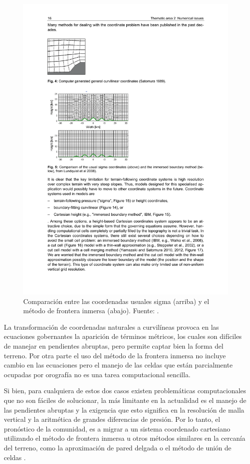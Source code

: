  
\begin{figure}[h!]
	\centering
	\includegraphics[width=0.8\linewidth,trim={2.6cm 13.5cm 9.2cm 9cm},clip]{Imagenes/02/coordinates}
	\caption{Comparación entre las coordenadas usuales sigma (arriba) y el método de frontera inmersa (abajo). Fuente: \cite{Arnold2010}.}
	\label{fig:02_coordinates}
\end{figure}
La transformación de coordenadas naturales a curvilíneas provoca en las ecuaciones gobernantes la aparición de términos métricos, los cuales son difíciles de manejar en pendientes abruptas, pero permite captar bien la forma del terreno. Por otra parte el uso del método de la frontera inmersa no incluye cambio en las ecuaciones pero el manejo de las celdas que están parcialmente ocupadas por orografía no es una tarea computacional sencilla.

Si bien, para cualquiera de estos dos casos existen problemáticas computacionales que no son fáciles de solucionar, la más limitante en la actualidad es el manejo de las pendientes abruptas y la exigencia que esto significa en la resolución de malla vertical y la aritmética de grandes diferencias de presión. Por lo tanto, el pronóstico de la comunidad, es a migrar a un sistema coordenado cartesiano utilizando el método de frontera inmersa u otros métodos similares en la cercanía del terreno, como la aproximación de pared delgada \citep{steppeler2002nonhydrostatic} o el método de unión de celdas \citep{yamazaki2010nonhydrostatic,yamazaki2012non}.

